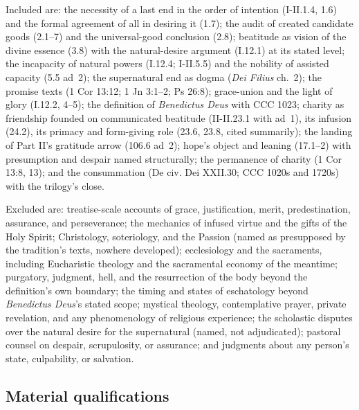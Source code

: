 Included are: the necessity of a last end in the order of intention (I-II.1.4, 1.6) and the formal agreement of all in desiring it (1.7); the audit of created candidate goods (2.1--7) and the universal-good conclusion (2.8); beatitude as vision of the divine essence (3.8) with the natural-desire argument (I.12.1) at its stated level; the incapacity of natural powers (I.12.4; I-II.5.5) and the nobility of assisted capacity (5.5 ad~2); the supernatural end as dogma (\emph{Dei Filius} ch.~2); the promise texts (1 Cor 13:12; 1 Jn 3:1--2; Ps 26:8); grace-union and the light of glory (I.12.2, 4--5); the definition of \emph{Benedictus Deus} with CCC 1023; charity as friendship founded on communicated beatitude (II-II.23.1 with ad~1), its infusion (24.2), its primacy and form-giving role (23.6, 23.8, cited summarily); the landing of Part II's gratitude arrow (106.6 ad~2); hope's object and leaning (17.1--2) with presumption and despair named structurally; the permanence of charity (1 Cor 13:8, 13); and the consummation (De civ. Dei XXII.30; CCC 1020s and 1720s) with the trilogy's close.

Excluded are: treatise-scale accounts of grace, justification, merit, predestination, assurance, and perseverance; the mechanics of infused virtue and the gifts of the Holy Spirit; Christology, soteriology, and the Passion (named as presupposed by the tradition's texts, nowhere developed); ecclesiology and the sacraments, including Eucharistic theology and the sacramental economy of the meantime; purgatory, judgment, hell, and the resurrection of the body beyond the definition's own boundary; the timing and states of eschatology beyond \emph{Benedictus Deus}'s stated scope; mystical theology, contemplative prayer, private revelation, and any phenomenology of religious experience; the scholastic disputes over the natural desire for the supernatural (named, not adjudicated); pastoral counsel on despair, scrupulosity, or assurance; and judgments about any person's state, culpability, or salvation.

\subsection{Material qualifications}

